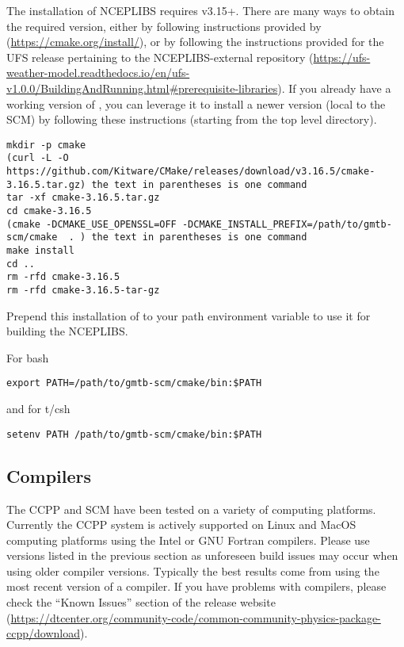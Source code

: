 The installation of NCEPLIBS requires  v3.15+. There are many ways to obtain the required version, either by following instructions provided by  (\url{https://cmake.org/install/}), or by following the instructions provided for the UFS release pertaining to the NCEPLIBS-external repository (\url{https://ufs-weather-model.readthedocs.io/en/ufs-v1.0.0/BuildingAndRunning.html#prerequisite-libraries}). If you already have a working version of , you can leverage it to install a newer version (local to the SCM) by following these instructions (starting from the top level  directory).

\begin{lstlisting}
mkdir -p cmake
(curl -L -O https://github.com/Kitware/CMake/releases/download/v3.16.5/cmake-3.16.5.tar.gz) the text in parentheses is one command
tar -xf cmake-3.16.5.tar.gz
cd cmake-3.16.5
(cmake -DCMAKE_USE_OPENSSL=OFF -DCMAKE_INSTALL_PREFIX=/path/to/gmtb-scm/cmake  . ) the text in parentheses is one command
make install
cd .. 
rm -rfd cmake-3.16.5 
rm -rfd cmake-3.16.5-tar-gz
\end{lstlisting}

Prepend this installation of  to your path environment variable to use it for building the NCEPLIBS.

For bash
\begin{lstlisting}
export PATH=/path/to/gmtb-scm/cmake/bin:$PATH
\end{lstlisting}
and for t/csh
\begin{lstlisting}
setenv PATH /path/to/gmtb-scm/cmake/bin:$PATH
\end{lstlisting}

\subsection{Compilers}
The CCPP and SCM have been tested on a variety of
computing platforms. Currently the CCPP system is actively supported
on Linux and MacOS computing platforms using the Intel or GNU Fortran
compilers. Please use versions listed in the previous section as unforeseen
build issues may occur when using older compiler versions. Typically the best results come from using the
most recent version of a compiler. If you have problems with compilers, please check the ``Known Issues'' section of the
release website (\url{https://dtcenter.org/community-code/common-community-physics-package-ccpp/download}).


